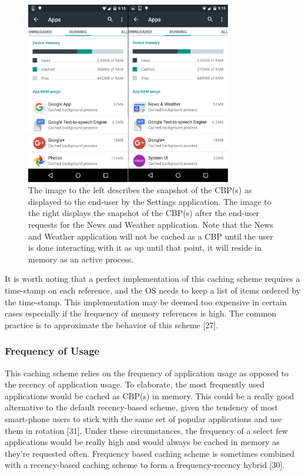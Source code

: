 \documentclass[12pt]{uthesis-v12}  %
\begin{document}
				\begin{figure}[!ht]
					\centering
					\includegraphics[width = 90mm]{images/beforeAndAfterNews.png}
					\caption[Before \& After News Application Launch]
					{The image to the left describes the snapshot of the CBP(s) as displayed to the end-user by the Settings application. The image to the right displays the snapshot of the CBP(s) after the end-user requests for the News and Weather application. Note that the News and Weather application will not be cached as a CBP until the user is done interacting with it as up until that point, it will reside in memory as an active process.}
				\end{figure}				
				
				It is worth noting that a perfect implementation of this caching scheme requires a time-stamp on each reference, and the OS needs to keep a list of items ordered by the time-stamp. This implementation may be deemed too expensive in certain cases especially if the frequency of memory references is high. The common practice is to approximate the behavior of this scheme [27].
			
			\subsubsection{Frequency of Usage}
				This caching scheme relies on the frequency of application usage as opposed to the recency of application usage. To elaborate, the most frequently used applications would be cached as CBP(s) in memory. This could be a really good alternative to the default recency-based scheme, given the tendency of most smart-phone users to stick with the same set of popular applications and use them in rotation [31]. Under these circumstances, the frequency of a select few applications would be really high and would always be cached in memory as they're requested often. Frequency based caching scheme is sometimes combined with a recency-based caching scheme to form a frequency-recency hybrid [30].
				 
\end{document}
